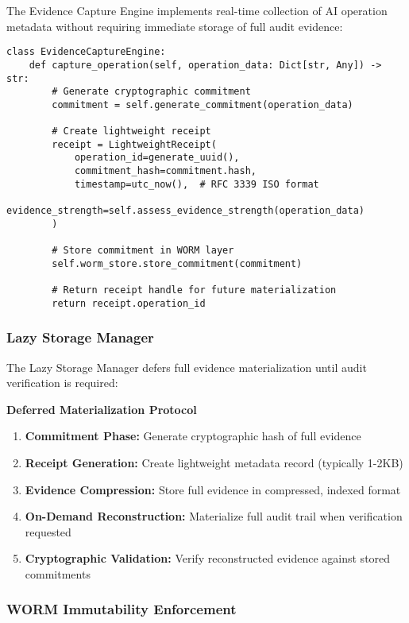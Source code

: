 \documentclass[12pt,a4paper]{article}
\begin{document}
The Evidence Capture Engine implements real-time collection of AI operation metadata without requiring immediate storage of full audit evidence:

\begin{lstlisting}[caption=Evidence Capture Core Algorithm]
class EvidenceCaptureEngine:
    def capture_operation(self, operation_data: Dict[str, Any]) -> str:
        # Generate cryptographic commitment
        commitment = self.generate_commitment(operation_data)
        
        # Create lightweight receipt
        receipt = LightweightReceipt(
            operation_id=generate_uuid(),
            commitment_hash=commitment.hash,
            timestamp=utc_now(),  # RFC 3339 ISO format
            evidence_strength=self.assess_evidence_strength(operation_data)
        )
        
        # Store commitment in WORM layer
        self.worm_store.store_commitment(commitment)
        
        # Return receipt handle for future materialization
        return receipt.operation_id
\end{lstlisting}

\subsubsection{Lazy Storage Manager}

The Lazy Storage Manager defers full evidence materialization until audit verification is required:

\begin{technicalbox}
\textbf{Deferred Materialization Protocol}
\begin{enumerate}
\item \textbf{Commitment Phase:} Generate cryptographic hash of full evidence
\item \textbf{Receipt Generation:} Create lightweight metadata record (typically 1-2KB)
\item \textbf{Evidence Compression:} Store full evidence in compressed, indexed format
\item \textbf{On-Demand Reconstruction:} Materialize full audit trail when verification requested
\item \textbf{Cryptographic Validation:} Verify reconstructed evidence against stored commitments
\end{enumerate}
\end{technicalbox}

\subsubsection{WORM Immutability Enforcement}
\end{document}
